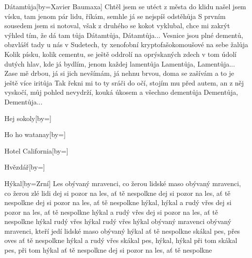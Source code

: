 \documentclass{article}
\begin{document}
\begin{songs}{}
\begin{song}{Dátamtůja}[by={Xavier Baumaxa}]
\beginverse
Chtěl jsem se utéct z města do klidu
našel jsem vísku, tam jenom pár lidu,
říkám, semhle já se nejspíš odstěhůja
S prvním sousedem jsem si notoval,
však z druhého se kokot vyklubal,
chce mi zakrýt výhled tím, že dá tam tůja
Dátamtůja, Dátamtůja...
\endverse
\beginverse
Vesnice jsou plné dementů,
obzvlášť tady u nás v Sudetech,
ty xenofobní kryptofašokomoušové na sebe žalůja
Kolik písku, kolik cementu,
se ještě oddrolí na oprýskaných zdech
v tom údolí dutých hlav, kde já bydlím, jenom každej lamentůja 
Lamentůja, Lamentůja...
\endverse
\beginverse
Zase mě drbou, já si jich nevšímám,
já nehnu brvou, doma se zašívám
a to je ještě více iritůja
Tak řekni mi to ty sráči do očí,
stojím mu před autem, an z něj vyskočí,
můj pohled nevydrží, kouká úkosem a všechno dementůja
Dementůja, Dementůja... 
\endverse
\end{song}

\begin{song}{Hej sokoly}[by={}]
\beginverse

\endverse
\end{song}


\begin{song}{Ho ho watanay}[by={}]
\beginverse

\endverse
\end{song}

\begin{song}{Hotel California}[by={}]
\beginverse

\endverse
\end{song}

\begin{song}{Hvězdář}[by={}]
\beginverse

\endverse
\end{song}


\begin{song}{Hýkal}[by={Zrní}]
\beginverse
Les
obývaný mravenci, co žerou lidské maso
obývaný mravenci, co žerou zlé lidi
dej si pozor na les, ať tě nespolkne
dej si pozor na les, ať tě nespolkne
dej si pozor na les, ať tě nespolkne hýkal,
hýkal a rudý vřes
dej si pozor na les, ať tě nespolkne hýkal a rudý vřes
dej si pozor na les, ať tě nespolkne hýkal
rudý vřes
hýkal
rudý vřes
hýkal obývaný mravenci
\endverse
\beginverse
obývaný mravenci, kteří jedí lidské maso
obývaný hýkal
ať tě nespolkne
skákal pes, přes oves
ať tě nespolkne hýkal a rudý vřes
skákal pes, hýkal, hýkal při tom
skákal pes, při tom hýkal
ať tě nespolkne
dej si pozor na les, ať tě nespolkne 
\endverse
\end{song}


\end{songs}
\end{document}
